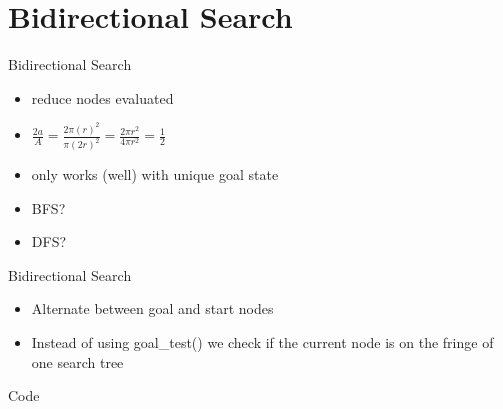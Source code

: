 \documentclass[presentation]{beamer}
\begin{document}
\section{Bidirectional Search}
\begin{frame}{Bidirectional Search}
  \begin{itemize}
  \item reduce nodes evaluated
  \item $\frac{2a}{A} =
    \frac{2\pi(r)^2}{\pi(2r)^2} =
    \frac{2\pi r^2}{4\pi r^2} = \frac{1}{2}$
  \item only works (well) with
    unique goal state
  \end{itemize}
  \begin{center}
  \begin{itemize}
  \item<1> BFS?
  \item<1> DFS? 
  \end{itemize}
\end{center}
\end{frame}

\begin{frame}{Bidirectional Search}
  \begin{itemize}
   
  \item Alternate between goal and start nodes
  \item Instead of using goal\_test() we check if the current node is
    on the fringe of one search tree
  \end{itemize}
  Code
\end{frame}
\end{document}
